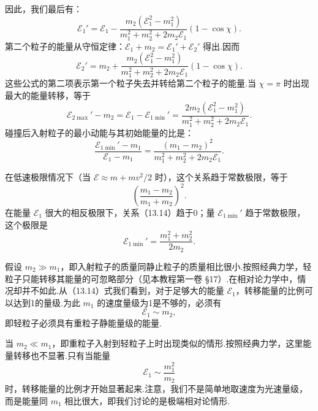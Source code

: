 因此，我们最后有：
\begin{equation}
  \mathcal{E}_1'=\mathcal{E}_1
  -\frac{m_2(\mathcal{E}_1^2-m_1^2)}{m_1^2+m_2^2+2m_2\mathcal{E}_1}
  (1-\cos\chi).
\end{equation}
第二个粒子的能量从守恒定律：$\mathcal{E}_1+m_2=\mathcal{E}_1'+\mathcal{E}_2'$ 得出.因而
\begin{equation}
  \mathcal{E}_2'=m_2
  +\frac{m_2(\mathcal{E}_1^2-m_1^2)}{m_1^2+m_2^2+2m_2\mathcal{E}_1}
  (1-\cos\chi).
\end{equation}
这些公式的第二项表示第一个粒子失去并转给第二个粒子的能量.当 $\chi=\pi$ 时出现最大的能量转移，等于
\begin{equation}
  \mathcal{E}_{2\max}'-m_2=\mathcal{E}_1-\mathcal{E}_{1\min}'
  =\frac{2m_2(\mathcal{E}_1^2-m_1^2)}{m_1^2+m_2^2+2m_2\mathcal{E}_1}.
\end{equation}
碰撞后入射粒子的最小动能与其初始能量的比是：
\begin{equation}
  \frac{\mathcal{E}_{1\min}'-m_1}{\mathcal{E}_1-m_1}
  =\frac{(m_1-m_2)^2}{m_1^2+m_2^2+2m_2\mathcal{E}_1}.
\end{equation}

在低速极限情况下（当 $\mathcal{E}\approx m+mv^2/2$ 时），这个关系趋于常数极限，等于
\begin{equation*}
  \left(\frac{m_1-m_2}{m_1+m_2}\right)^2.
\end{equation*}
在能量 $\mathcal{E}_1$ 很大的相反极限下，关系（13.14）趋于0；量 $\mathcal{E}_{1\min}'$ 趋于常数极限，这个极限是
\begin{equation*}
  \mathcal{E}_{1\min}'=\frac{m_1^2+m_2^2}{2m_2}.
\end{equation*}

假设 $m_2\gg m_1$，即入射粒子的质量同静止粒子的质量相比很小.按照经典力学，轻粒子只能转移其能量的可忽略部分（见本教程第一卷 §17）.在相对论力学中，情况却并不如此.从（13.14）式我们看到，对于足够大的能量 $\mathcal{E}_1$，转移能量的比例可以达到1的量级.为此 $m_1$ 的速度量级为1是不够的，必须有
\begin{equation*}
  \mathcal{E}_1\sim m_2,
\end{equation*}
即轻粒子必须具有重粒子静能量级的能量.

当 $m_2\ll m_1$，即重粒子入射到轻粒子上时出现类似的情形.按照经典力学，这里能量转移也不显著.只有当能量
\begin{equation*}
  \mathcal{E}_1\sim\frac{m_1^2}{m_2}
\end{equation*}
时，转移能量的比例才开始显著起来.注意，我们不是简单地取速度为光速量级，而是能量同 $m_1$ 相比很大，即我们讨论的是极端相对论情形.

